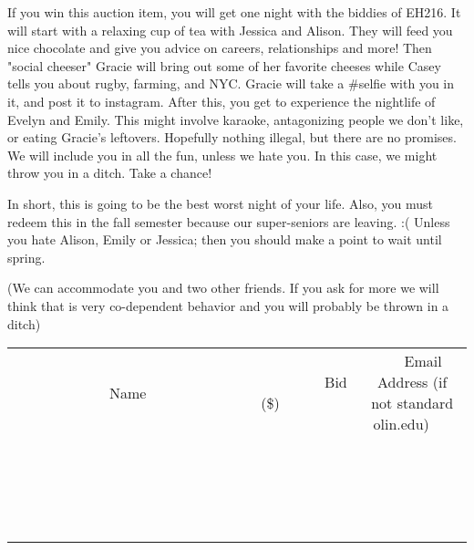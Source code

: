 \documentclass[11pt]{article}
\begin{document}
If you win this auction item, you will get one night with the biddies of EH216. It will start with a relaxing cup of tea with Jessica and Alison. They will feed you nice chocolate and give you advice on careers, relationships and more! Then "social cheeser" Gracie will bring out some of her favorite cheeses while Casey tells you about rugby, farming, and NYC. Gracie will take a \#selfie with you in it, and post it to instagram. After this, you get to experience the nightlife of Evelyn and Emily. This might involve karaoke, antagonizing people we don't like, or eating Gracie's leftovers. Hopefully nothing illegal, but there are no promises. We will include you in all the fun, unless we hate you. In this case, we might throw you in a ditch. Take a chance!

In short, this is going to be the best worst night of your life. Also, you must redeem this in the fall semester because our super-seniors are leaving. :( Unless you hate Alison, Emily or Jessica; then you should make a point to wait until spring.

(We can accommodate you and two other friends. If you ask for more we will think that is very co-dependent behavior and you will probably be thrown in a ditch)
\\[3ex]
\begin{tabular}{c c c}
~~~~~~~~~~~~~Name~~~~~~~~~~~~~ & ~~~~~~~~~Bid (\$)~~~~~~~~~  & ~~~Email Address (if not standard olin.edu)~~~\\
 & & \\
\hline
 & & \\
\hline
 & & \\
\hline
 & & \\
\hline
 & & \\
\hline
 & & \\
\hline
 & & \\
\hline
 & & \\
\hline
 & & \\
\hline
 & & \\
\hline
 & & \\
\hline
 & & \\
\hline
 & & \\
\hline
 & & \\
\hline
 & & \\
\hline
 & & \\
\hline
 & & \\
\hline
 & & \\
\hline
 & & \\
\hline
\end{tabular}
\newpage
\end{document}
